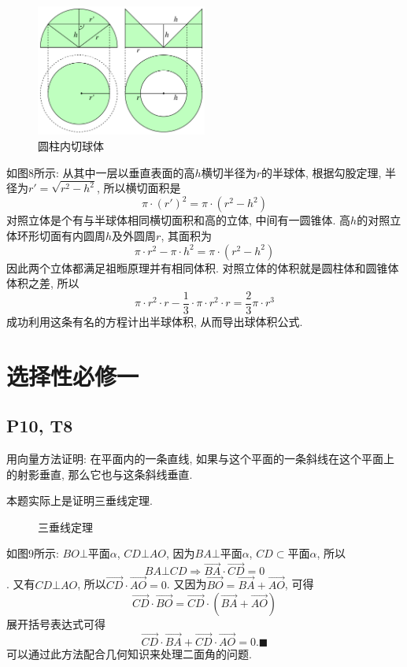 \documentclass{book}
\begin{document}
    \begin{figure}[htbp]
        \centering
        \includegraphics[width=0.5\textwidth]{img/Cavalieri_half-ball.svg.png}
        \caption{圆柱内切球体}
    \end{figure}

    如图8所示: 从其中一层以垂直表面的高$h$横切半径为$r$的半球体, 根据勾股定理, 半径为${\displaystyle r'={\sqrt {r^{2}-h^{2}}}}$, 所以横切面积是$${\displaystyle \pi \cdot (r')^{2}=\pi \cdot (r^{2}-h^{2})}$$对照立体是个有与半球体相同横切面积和高的立体, 中间有一圆锥体. 高$h$的对照立体环形切面有内圆周$h$及外圆周$r$, 其面积为$${\displaystyle \pi \cdot r^{2}-\pi \cdot h^{2}=\pi \cdot (r^{2}-h^{2})}$$因此两个立体都满足祖暅原理并有相同体积. 对照立体的体积就是圆柱体和圆锥体体积之差, 所以$${\displaystyle \pi \cdot r^{2}\cdot r-{\frac {1}{3}}\cdot \pi \cdot r^{2}\cdot r={\frac {2}{3}}\pi \cdot r^{3}}$$成功利用这条有名的方程计出半球体积, 从而导出球体积公式.

    \chapter{选择性必修一}
    \section{\textcolor[rgb]{0.11,0.65,0.52}{P10, T8}}
    \begin{boxB}
        用向量方法证明: 在平面内的一条直线, 如果与这个平面的一条斜线在这个平面上的射影垂直, 那么它也与这条斜线垂直.
    \end{boxB}
    本题实际上是证明\textcolor[rgb]{0.38,0.11,0.2}{三垂线定理}.


    \begin{figure}[htbp]
        \centering
        
        \caption{三垂线定理}
    \end{figure}
    如图9所示: $BO \bot $平面$\alpha$, $CD\bot AO$, 因为$BA \bot $平面$\alpha$, $CD\subset $平面$\alpha$, 所以$$BA\bot CD\Longrightarrow \overrightarrow{BA}\cdot \overrightarrow{CD}=0$$.
    又有$CD\bot AO$, 所以$\overrightarrow{CD}\cdot \overrightarrow{AO}=0$.
    又因为$\overrightarrow{BO}=\overrightarrow{BA}+\overrightarrow{AO}$, 可得$$\overrightarrow{CD}\cdot\overrightarrow{BO}=\overrightarrow{CD}\cdot\left( \overrightarrow{BA}+\overrightarrow{AO} \right)$$
    展开括号表达式可得$$\overrightarrow{CD}\cdot\overrightarrow{BA}+\overrightarrow{CD}\cdot\overrightarrow{AO}=0. \blacksquare$$
    可以通过此方法配合几何知识来处理二面角的问题.
\end{document}
